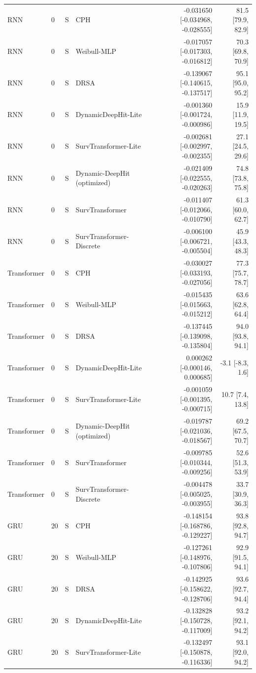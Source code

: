 \begin{longtable}{lll p{3.0cm} rr}
RNN & 0 & S & CPH & -0.031650 [-0.034968, -0.028555] & 81.5 [79.9, 82.9]\\
RNN & 0 & S & Weibull-MLP & -0.017057 [-0.017303, -0.016812] & 70.3 [69.8, 70.9]\\
RNN & 0 & S & DRSA & -0.139067 [-0.140615, -0.137517] & 95.1 [95.0, 95.2]\\
RNN & 0 & S & DynamicDeepHit-Lite & -0.001360 [-0.001724, -0.000986] & 15.9 [11.9, 19.5]\\
RNN & 0 & S & SurvTransformer-Lite & -0.002681 [-0.002997, -0.002355] & 27.1 [24.5, 29.6]\\
RNN & 0 & S & Dynamic-DeepHit (optimized) & -0.021409 [-0.022555, -0.020263] & 74.8 [73.8, 75.8]\\
RNN & 0 & S & SurvTransformer & -0.011407 [-0.012066, -0.010790] & 61.3 [60.0, 62.7]\\
RNN & 0 & S & SurvTransformer-Discrete & -0.006100 [-0.006721, -0.005504] & 45.9 [43.3, 48.3]\\
Transformer & 0 & S & CPH & -0.030027 [-0.033193, -0.027056] & 77.3 [75.7, 78.7]\\
Transformer & 0 & S & Weibull-MLP & -0.015435 [-0.015663, -0.015212] & 63.6 [62.8, 64.4]\\
Transformer & 0 & S & DRSA & -0.137445 [-0.139098, -0.135804] & 94.0 [93.8, 94.1]\\
Transformer & 0 & S & DynamicDeepHit-Lite & 0.000262 [-0.000146, 0.000685] & -3.1 [-8.3, 1.6]\\
Transformer & 0 & S & SurvTransformer-Lite & -0.001059 [-0.001395, -0.000715] & 10.7 [7.4, 13.8]\\
Transformer & 0 & S & Dynamic-DeepHit (optimized) & -0.019787 [-0.021036, -0.018567] & 69.2 [67.5, 70.7]\\
Transformer & 0 & S & SurvTransformer & -0.009785 [-0.010344, -0.009256] & 52.6 [51.3, 53.9]\\
Transformer & 0 & S & SurvTransformer-Discrete & -0.004478 [-0.005025, -0.003955] & 33.7 [30.9, 36.3]\\
GRU & 20 & S & CPH & -0.148154 [-0.168786, -0.129227] & 93.8 [92.8, 94.7]\\
GRU & 20 & S & Weibull-MLP & -0.127261 [-0.148976, -0.107806] & 92.9 [91.5, 94.1]\\
GRU & 20 & S & DRSA & -0.142925 [-0.158622, -0.128706] & 93.6 [92.7, 94.4]\\
GRU & 20 & S & DynamicDeepHit-Lite & -0.132828 [-0.150728, -0.117009] & 93.2 [92.1, 94.2]\\
GRU & 20 & S & SurvTransformer-Lite & -0.132497 [-0.150878, -0.116336] & 93.1 [92.0, 94.2]\\

\end{longtable}
